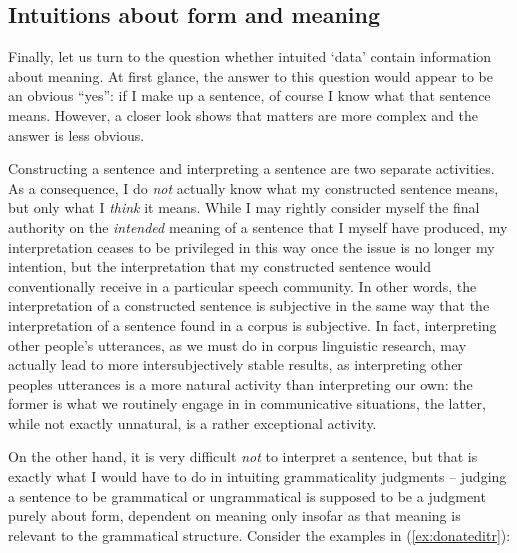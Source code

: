 \subsection{Intuitions about form and meaning}
\label{sec:intuitionsaboutformandmeaning}

Finally, let us turn to the question whether intuited `data' contain information about meaning. At first glance, the answer to this question would appear to be an obvious ``yes'': if I make up a sentence, of course I know what that sentence means. However, a closer look shows that matters are more complex and the answer is less obvious. 

Constructing a sentence and interpreting a sentence are two separate activities. As a consequence, I do \textit{not} actually know what my constructed sentence means, but only what I \textit{think} it means. While I may rightly consider myself the final authority on the \textit{intended} meaning of a sentence that I myself have produced, my interpretation ceases to be privileged in this way once the issue is no longer my intention, but the interpretation that my constructed sentence would conventionally receive in a particular speech community. In other words, the interpretation of a constructed sentence is subjective in the same way that the interpretation of a sentence found in a corpus is subjective. In fact, interpreting other people's utterances, as we must do in corpus linguistic research, may actually lead to more intersubjectively stable results, as interpreting other peoples utterances is a more natural activity than interpreting our own: the former is what we routinely engage in in communicative situations, the latter, while not exactly unnatural, is a rather exceptional activity.

On the other hand, it is very difficult \emph{not} to interpret a sentence, but that is exactly what I would have to do in intuiting grammaticality judgments -- judging a sentence to be grammatical or ungrammatical is supposed to be a judgment purely about form, dependent on meaning only insofar as that meaning is relevant to the grammatical structure. Consider the examples in (\ref{ex:donateditr}):

